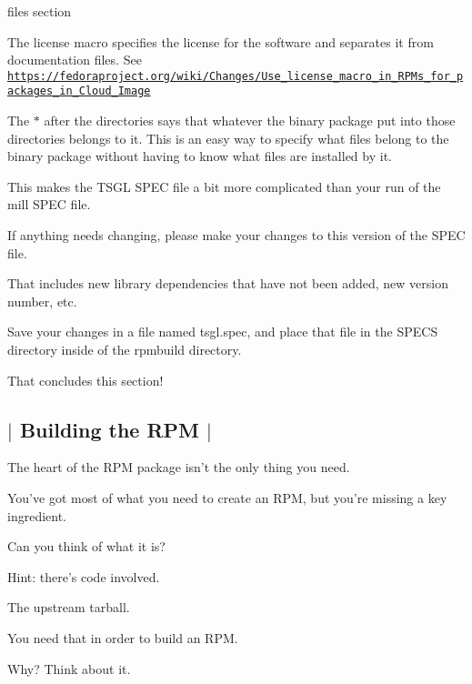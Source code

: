 \begin{DoxyItemize}
\begin{DoxyItemize}
\end{DoxyItemize}
\item {\ttfamily files} section
\begin{DoxyItemize}
\item The {\ttfamily license} macro specifies the license for the software and separates it from documentation files. See \href{https://fedoraproject.org/wiki/Changes/Use_license_macro_in_RPMs_for_packages_in_Cloud_Image}{\tt https\-://fedoraproject.\-org/wiki/\-Changes/\-Use\-\_\-license\-\_\-macro\-\_\-in\-\_\-\-R\-P\-Ms\-\_\-for\-\_\-packages\-\_\-in\-\_\-\-Cloud\-\_\-\-Image}
\item The {\ttfamily $\ast$} after the directories says that whatever the binary package put into those directories belongs to it. This is an easy way to specify what files belong to the binary package without having to know what files are installed by it.
\end{DoxyItemize}
\end{DoxyItemize}

This makes the T\-S\-G\-L S\-P\-E\-C file a bit more complicated than your run of the mill S\-P\-E\-C file.

If anything needs changing, please make your changes to this version of the S\-P\-E\-C file.

That includes new library dependencies that have not been added, new version number, etc.

Save your changes in a file named {\ttfamily tsgl.\-spec}, and place that file in the {\ttfamily S\-P\-E\-C\-S directory} inside of the {\ttfamily rpmbuild} directory.

That concludes this section! 

 \subsection*{$\vert$ Building the R\-P\-M $\vert$ }

The heart of the R\-P\-M package isn't the only thing you need.

You've got most of what you need to create an R\-P\-M, but you're missing a key ingredient.

Can you think of what it is?

Hint\-: there's code involved.

The upstream tarball.

You need that in order to build an R\-P\-M.

Why? Think about it.

